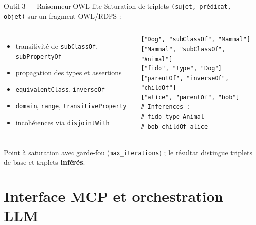 \documentclass[10pt,aspectratio=169]{beamer}
\begin{document}
\begin{frame}[fragile]{Outil 3 --- Raisonneur OWL-lite}
  Saturation de triplets \texttt{(sujet, prédicat, objet)} sur un fragment
  OWL/RDFS :
  \begin{columns}[T]
    \begin{itemize}
      \item transitivité de \texttt{subClassOf}, \texttt{subPropertyOf}
      \item propagation des types et assertions
      \item \texttt{equivalentClass}, \texttt{inverseOf}
      \item \texttt{domain}, \texttt{range}, \texttt{transitiveProperty}
      \item incohérences via \texttt{disjointWith}
    \end{itemize}
\begin{lstlisting}
["Dog", "subClassOf", "Mammal"]
["Mammal", "subClassOf", "Animal"]
["fido", "type", "Dog"]
["parentOf", "inverseOf", "childOf"]
["alice", "parentOf", "bob"]
# Inferences :
# fido type Animal
# bob childOf alice
\end{lstlisting}
  \end{columns}
  \vfill
  Point à saturation avec garde-fou (\texttt{max\_iterations}) ; le résultat
  distingue triplets de base et triplets \textbf{inférés}.
\end{frame}

\section{Interface MCP et orchestration LLM}
\end{document}
